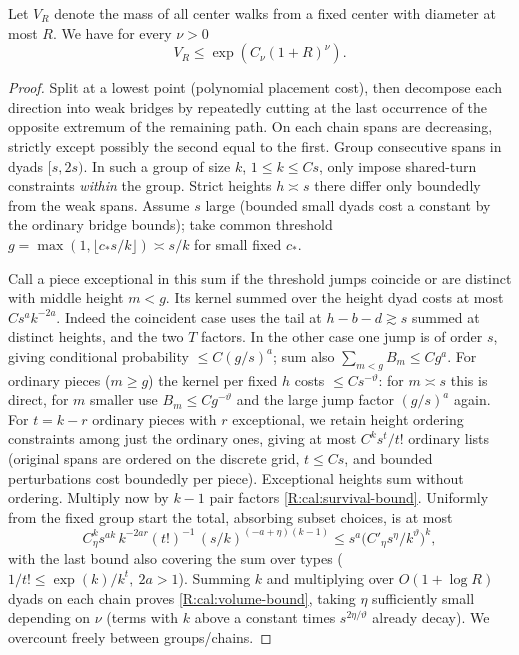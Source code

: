 \begin{proposition}\label{R:cal:volume}
Let \(V_R\) denote the mass of all center walks from a fixed center with diameter at most \(R\). We have for every \(\nu>0\)
\begin{equation}
 V_R\le \exp(C_\nu(1+R)^\nu).                                                \label{R:cal:volume-bound}
\end{equation}
\end{proposition}
\begin{proof}
Split at a lowest point (polynomial placement cost), then decompose each direction into weak bridges by repeatedly cutting at the last occurrence of the opposite extremum of the remaining path. On each chain spans are decreasing, strictly except possibly the second equal to the first. Group consecutive spans in dyads \([s,2s)\). In such a group of size \(k\), \(1\le k\le C s\), only impose shared-turn constraints \emph{within} the group. Strict heights \(h\asymp s\) there differ only boundedly from the weak spans. Assume \(s\) large (bounded small dyads cost a constant by the ordinary bridge bounds); take common threshold \(g=\max(1,\lfloor c_*s/k\rfloor)\asymp s/k\) for small fixed \(c_*\).

Call a piece exceptional in this sum if the threshold jumps coincide or are distinct with middle height \(m<g\). Its kernel summed over the height dyad costs at most \(C s^a k^{-2a}\). Indeed the coincident case uses the tail at \(h-b-d\gtrsim s\) summed at distinct heights, and the two \(T\) factors. In the other case one jump is of order \(s\), giving conditional probability \(\le C(g/s)^a\); sum also \(\sum_{m<g}B_m\le Cg^a\). For ordinary pieces (\(m\ge g\)) the kernel per fixed \(h\) costs \(\le C s^{-\vartheta}\): for \(m\asymp s\) this is direct, for \(m\) smaller use \(B_m\le C g^{-\vartheta}\) and the large jump factor \((g/s)^a\) again. For \(t=k-r\) ordinary pieces with \(r\) exceptional, we retain height ordering constraints among just the ordinary ones, giving at most \(C^k s^t/t!\) ordinary lists (original spans are ordered on the discrete grid, \(t\le Cs\), and bounded perturbations cost boundedly per piece). Exceptional heights sum without ordering. Multiply now by \(k-1\) pair factors \eqref{R:cal:survival-bound}. Uniformly from the fixed group start the total, absorbing subset choices, is at most
\[
 C_\eta^k s^{ak}\, k^{-2ar}(t!)^{-1}\,(s/k)^{(-a+\eta)(k-1)}
       \le s^a\big(C'_\eta s^\eta/k^\vartheta\big)^k ,
\]
with the last bound also covering the sum over types (\(1/t!\le \exp(k)/k^t,\ 2a>1\)). Summing \(k\) and multiplying over \(O(1+\log R)\) dyads on each chain proves \eqref{R:cal:volume-bound}, taking \(\eta\) sufficiently small depending on \(\nu\) (terms with \(k\) above a constant times \(s^{2\eta/\vartheta}\) already decay). We overcount freely between groups/chains.

\end{proof}

